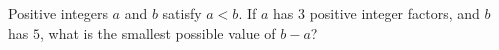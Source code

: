 Positive integers $a$ and $b$ satisfy $a < b$. If $a$ has $3$ positive integer factors, and $b$ has $5$, what is the smallest possible value of $b - a$?
